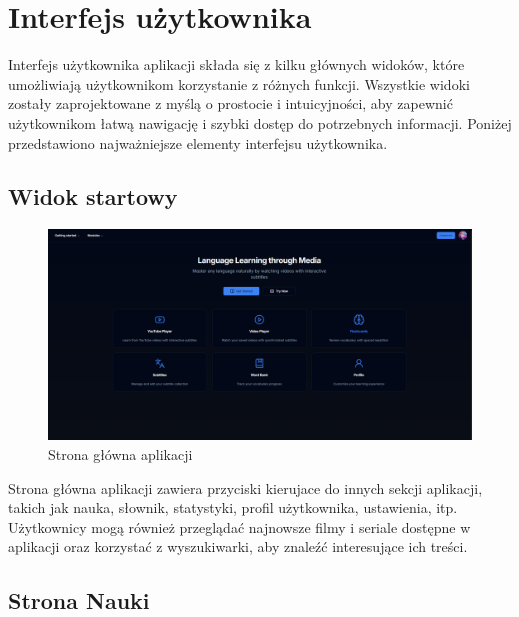 \section{Interfejs użytkownika}
Interfejs użytkownika aplikacji składa się z kilku głównych widoków, które umożliwiają użytkownikom korzystanie z różnych funkcji. Wszystkie widoki zostały zaprojektowane z myślą o prostocie i intuicyjności, aby zapewnić użytkownikom łatwą nawigację i szybki dostęp do potrzebnych informacji. Poniżej przedstawiono najważniejsze elementy interfejsu użytkownika.


\subsection{Widok startowy}

\begin{figure}[H]
    \centering
    \includegraphics[width=1\textwidth]{IMAGE/HomePage.png}
    \caption{Strona główna aplikacji}
    \label{fig:Widok strony głównej aplikacji}
\end{figure}
Strona główna aplikacji zawiera przyciski kierujace do innych sekcji aplikacji, takich jak nauka, słownik, statystyki, profil użytkownika, ustawienia, itp. Użytkownicy mogą również przeglądać najnowsze filmy i seriale dostępne w aplikacji oraz korzystać z wyszukiwarki, aby znaleźć interesujące ich treści.

\subsection{Strona Nauki}

